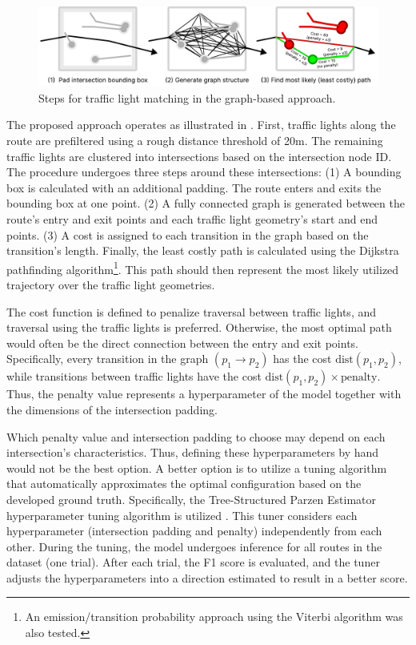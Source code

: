 \begin{figure}[t]
\centering
\includegraphics[width=\linewidth]{images/sg-selection-graph-approach.pdf}
\caption{Steps for traffic light matching in the graph-based approach.}
\label{fig:sg-selection-graph-approach}
\end{figure}

The proposed approach operates as illustrated in . First, traffic lights along the route are prefiltered using a rough distance threshold of 20m. The remaining traffic lights are clustered into intersections based on the intersection node ID. The procedure undergoes three steps around these intersections: (1) A bounding box is calculated with an additional padding. The route enters and exits the bounding box at one point. (2) A fully connected graph is generated between the route's entry and exit points and each traffic light geometry's start and end points. (3) A cost is assigned to each transition in the graph based on the transition's length. Finally, the least costly path is calculated using the Dijkstra pathfinding algorithm\footnote{An emission/transition probability approach using the Viterbi algorithm was also tested.}. This path should then represent the most likely utilized trajectory over the traffic light geometries.

The cost function is defined to penalize traversal between traffic lights, and traversal using the traffic lights is preferred. Otherwise, the most optimal path would often be the direct connection between the entry and exit points. Specifically, every transition in the graph  $(p_{1} \rightarrow p_{2})$ has the cost $\text{dist}(p_{1}, p_{2})$, while transitions between traffic lights have the cost $\text{dist}(p_{1}, p_{2}) \times \text{penalty}$. Thus, the penalty value represents a hyperparameter of the model together with the dimensions of the intersection padding. 

Which penalty value and intersection padding to choose may depend on each intersection's characteristics. Thus, defining these hyperparameters by hand would not be the best option. A better option is to utilize a tuning algorithm that automatically approximates the optimal configuration based on the developed ground truth. Specifically, the Tree-Structured Parzen Estimator hyperparameter tuning algorithm is utilized \cite{ozaki_multiobjective_2020}. This tuner considers each hyperparameter (intersection padding and penalty) independently from each other. During the tuning, the model undergoes inference for all routes in the dataset (one trial). After each trial, the F1 score is evaluated, and the tuner adjusts the hyperparameters into a direction estimated to result in a better score.

